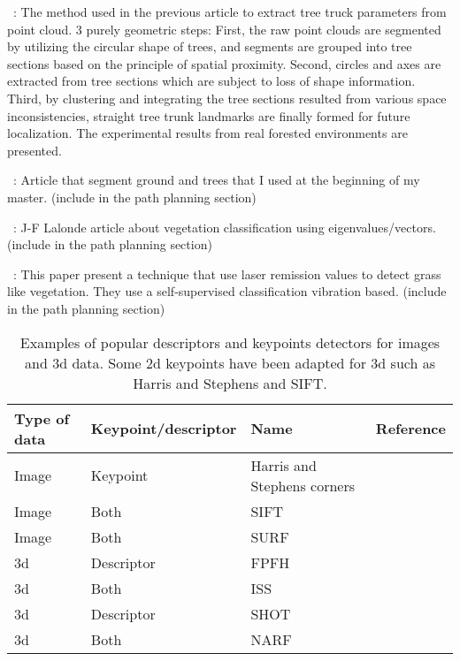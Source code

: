 ~\cite{Iagnemma2012}:
The method used in the previous article to extract tree truck parameters from point cloud. 3 purely geometric steps: First, the raw point clouds are segmented by utilizing the circular shape of trees, and segments are grouped into tree sections based on the principle of spatial proximity. Second, circles and axes are extracted from tree sections which are subject to loss of shape information. Third, by clustering and integrating the tree sections resulted from various space inconsistencies, straight tree trunk landmarks are finally formed for future localization. The experimental results from real forested environments are presented.

~\cite{Mcdaniel2012}:
Article that segment ground and trees that I used at the beginning of my master. (include in the path planning section)

~\cite{Lalonde2006}:
J-F Lalonde article about vegetation classification using eigenvalues/vectors. (include in the path planning section)

~\cite{Wurm2009}:
This paper present a technique that use laser remission values to detect grass like vegetation. They use a self-supervised classification vibration based. (include in the path planning section)

\begin{table}[H]
    \centering
    \begin{tabular}{@{}llll@{}}
        \toprule
        \textbf{Type of data}  & \textbf{Keypoint/descriptor} & \textbf{Name}               & \textbf{Reference} \\
        \hline
        Image                  & Keypoint                     & Harris and Stephens corners & \cite{Harris1988}  \\
        Image                  & Both                         & SIFT                        & \cite{Lowe2004}    \\
        Image                  & Both                         & SURF                        & \cite{Bay2006}     \\
        \gls*{3d}              & Descriptor                   & FPFH                        & \cite{Rusu2009}    \\
        \gls*{3d}              & Both                         & ISS                         & \cite{Yu2009}      \\
        \gls*{3d}              & Descriptor                   & SHOT                        & \cite{Tombari2010} \\
        \gls*{3d}              & Both                         & NARF                        & \cite{Steder2011a} \\
        \bottomrule
    \end{tabular}
    \caption[Examples of popular descriptors and keypoints detectors for images and \gls*{3d} data.]{Examples of popular descriptors and keypoints detectors for images and \gls*{3d} data. Some \gls*{2d} keypoints have been adapted for \gls*{3d} such as Harris and Stephens and SIFT.}
    \label{tab:features_examples}
\end{table}
